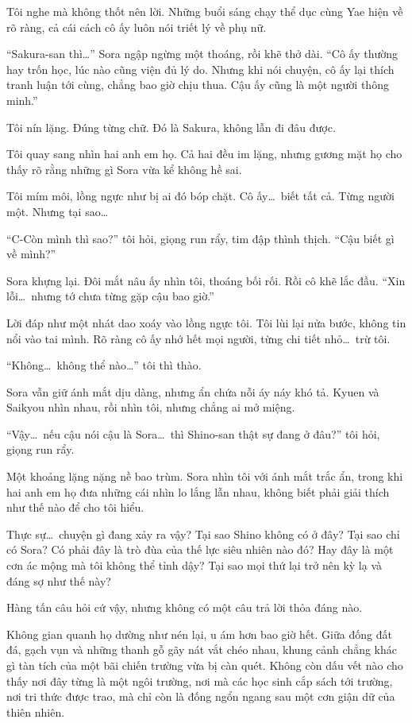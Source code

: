 \documentclass[../main.tex]{subfiles}
\begin{document}
Tôi nghe mà không thốt nên lời. Những buổi sáng chạy thể dục cùng Yae hiện về rõ ràng, cả cái cách cô ấy luôn nói triết lý về phụ nữ.

``Sakura-san thì\dots'' Sora ngập ngừng một thoáng, rồi khẽ thở dài. ``Cô ấy thường hay trốn học, lúc nào cũng viện đủ lý do. Nhưng khi nói chuyện, cô ấy lại thích tranh luận tới cùng, chẳng bao giờ chịu thua. Cậu ấy cũng là một người thông minh.''

Tôi nín lặng. Đúng từng chữ. Đó là Sakura, không lẫn đi đâu được.

Tôi quay sang nhìn hai anh em họ. Cả hai đều im lặng, nhưng gương mặt họ cho thấy rõ rằng những gì Sora vừa kể không hề sai.

Tôi mím môi, lồng ngực như bị ai đó bóp chặt. Cô ấy\dots\ biết tất cả. Từng người một. Nhưng tại sao\dots\

``C-Còn mình thì sao?'' tôi hỏi, giọng run rẩy, tim đập thình thịch. ``Cậu biết gì về mình?''

Sora khựng lại. Đôi mắt nâu ấy nhìn tôi, thoáng bối rối. Rồi cô khẽ lắc đầu. ``Xin lỗi\dots\ nhưng tớ chưa từng gặp cậu bao giờ.''

Lời đáp như một nhát dao xoáy vào lồng ngực tôi. Tôi lùi lại nửa bước, không tin nổi vào tai mình. Rõ ràng cô ấy nhớ hết mọi người, từng chi tiết nhỏ\dots\ trừ tôi.

``Không\dots\ không thể nào\dots'' tôi thì thào.

Sora vẫn giữ ánh mắt dịu dàng, nhưng ẩn chứa nỗi áy náy khó tả. Kyuen và Saikyou nhìn nhau, rồi nhìn tôi, nhưng chẳng ai mở miệng.

``Vậy\dots\ nếu cậu nói cậu là Sora\dots\ thì Shino-san thật sự đang ở đâu?'' tôi hỏi, giọng run rẩy.

Một khoảng lặng nặng nề bao trùm. Sora nhìn tôi với ánh mắt trắc ẩn, trong khi hai anh em họ đưa những cái nhìn lo lắng lẫn nhau, không biết phải giải thích như thế nào để cho tôi hiểu.

Thực sự\dots\ chuyện gì đang xảy ra vậy? Tại sao Shino không có ở đây? Tại sao chỉ có Sora? Có phải đây là trò đùa của thế lực siêu nhiên nào đó? Hay đây là một cơn ác mộng mà tôi không thể tỉnh dậy? Tại sao mọi thứ lại trở nên kỳ lạ và đáng sợ như thế này?

Hàng tấn câu hỏi cứ vậy, nhưng không có một câu trả lời thỏa đáng nào.

\pov{-}

Không gian quanh họ dường như nén lại, u ám hơn bao giờ hết. Giữa đống đất đá, gạch vụn và những thanh gỗ gãy nát vắt chéo nhau, khung cảnh chẳng khác gì tàn tích của một bãi chiến trường vừa bị càn quét. Không còn dấu vết nào cho thấy nơi đây từng là một ngôi trường, nơi mà các học sinh cắp sách tới trường, nơi tri thức được trao, mà chỉ còn là đống ngổn ngang sau một cơn giận dữ của thiên nhiên.
\end{document}
